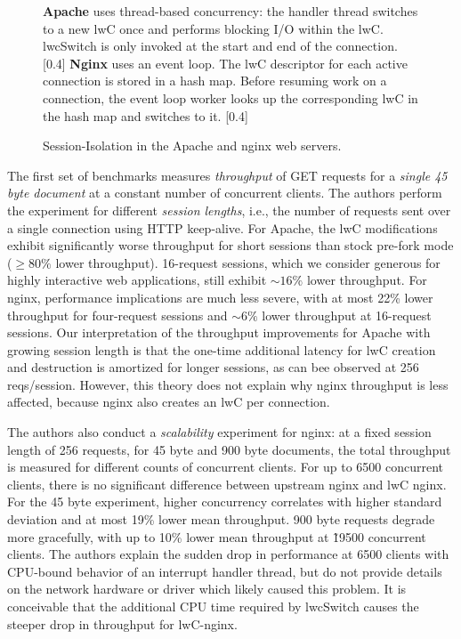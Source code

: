 \documentclass[10pt,twocolumn,a4paper]{article}
\begin{document}
\begin{figure}
  \centering
  \subcaptionbox
  {\textbf{Apache} uses thread-based concurrency: the handler thread switches to a new lwC once and performs blocking I/O within the lwC. lwcSwitch is only invoked at the start and end of the connection.}
  [0.4\linewidth]
  {
  }
  \hspace{1cm}
  \subcaptionbox
  {\textbf{Nginx} uses an event loop. The lwC descriptor for each active connection is stored in a hash map. Before resuming work on a connection, the event loop worker looks up the corresponding lwC in the hash map and switches to it.}
  [0.4\linewidth]
  {
  }
  \caption{Session-Isolation in the Apache and nginx web servers.\label{eval:web:pseudocode}}
\end{figure}

The first set of benchmarks measures \textit{throughput} of GET requests for a \textit{single 45 byte document} at a constant number of concurrent clients.
The authors perform the experiment for different \textit{session lengths}, i.e., the number of requests sent over a single connection using HTTP keep-alive.
For Apache, the lwC modifications exhibit significantly worse throughput for short sessions than stock pre-fork mode ($\ge80\%$ lower throughput).
16-request sessions, which we consider generous for highly interactive web applications, still exhibit $\sim 16\%$ lower throughput.
For nginx, performance implications are much less severe, with at most 22\% lower throughput for four-request sessions and $\sim 6\%$ lower throughput at 16-request sessions.
Our interpretation of the throughput improvements for Apache with growing session length is that the one-time additional latency for lwC creation and destruction is amortized for longer sessions, as can bee observed at 256 reqs/session.
However, this theory does not explain why nginx throughput is less affected, because nginx also creates an lwC per connection.
\cite{lwcpaper}

The authors also conduct a \textit{scalability} experiment for nginx:
at a fixed session length of 256 requests, for 45 byte and 900 byte documents, the total throughput is measured for different counts of concurrent clients.
For up to 6500 concurrent clients, there is no significant difference between upstream nginx and lwC nginx.
For the 45 byte experiment, higher concurrency correlates with higher standard deviation and at most 19\% lower mean throughput.
900 byte requests degrade more gracefully, with up to 10\% lower mean throughput at \~19500 concurrent clients.
The authors explain the sudden drop in performance at 6500 clients with CPU-bound behavior of an interrupt handler thread, but do not provide details on the network hardware or driver which likely caused this problem.
It is conceivable that the additional CPU time required by lwcSwitch causes the steeper drop in throughput for lwC-nginx.
\cite{lwcpaper}
\end{document}
